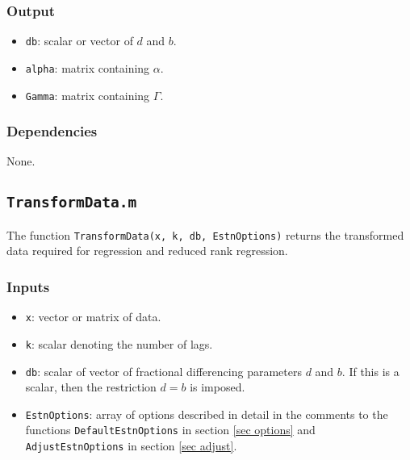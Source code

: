 \documentclass[12pt]{article}
\begin{document}
\subsubsection*{Output}

\begin{itemize}

\item \texttt{db}: scalar or vector of $d$ and $b$.

\item \texttt{alpha}: matrix containing $\alpha$.

\item \texttt{Gamma}: matrix containing $\Gamma$.

\end{itemize}


\subsubsection*{Dependencies}

None.





\newpage


\subsection{\texttt{TransformData.m}}

The function \texttt{TransformData(x, k, db, EstnOptions)} returns the transformed data required for regression and reduced rank regression.


\subsubsection*{Inputs}

\begin{itemize}

\item \texttt{x}: vector or matrix of data.

\item \texttt{k}: scalar denoting the number of lags.

\item \texttt{db}: scalar of vector of fractional differencing parameters $d$ and $b$. If this is a scalar, then the restriction $d=b$ is imposed.

\item \texttt{EstnOptions}: array of options described in detail in the comments to the functions \texttt{DefaultEstnOptions} in section \ref{sec options} and \texttt{AdjustEstnOptions} in section \ref{sec adjust}. 

\end{itemize}
\end{document}
